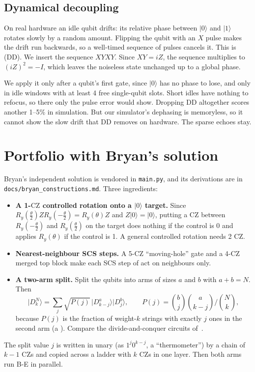 \documentclass[11pt]{scrartcl}
\newcommand{\ket}[1]{\lvert #1\rangle}
\newcommand{\D}[2]{D^{#1}_{#2}}
\newcommand{\CZ}{\ensuremath{\mathrm{CZ}}}
\newcommand{\file}[1]{\texttt{\small #1}}
\begin{document}
\subsection{Dynamical decoupling}

On real hardware an idle qubit drifts: its relative phase between $\ket0$ and $\ket1$ rotates
slowly by a random amount. Flipping the qubit with an $X$ pulse makes the drift run backwards, so a
well-timed sequence of pulses cancels it. This is  (DD). We insert the
sequence $XYXY$. Since $XY=iZ$, the sequence multiplies to $(iZ)^2=-I$, which leaves the noiseless
state unchanged up to a global phase.

We apply it only after a qubit's first gate, since $\ket0$ has no phase to lose, and only in idle
windows with at least 4 free single-qubit slots. Short idles have nothing to refocus, so there only
the pulse error would show. Dropping DD altogether scores another 1--5\% in simulation. But our
simulator's dephasing is memoryless, so it cannot show the slow drift that DD removes on hardware.
The sparse echoes stay.

\section{Portfolio with Bryan's solution}\label{sec:bryan}

Bryan's independent solution is vendored in \file{main.py}, and its derivations are in
\file{docs/bryan\_constructions.md}. Three ingredients:
\begin{itemize}
  \item \textbf{A 1-\CZ{} controlled rotation onto a $\ket0$ target.} Since
        $R_y(\tfrac\theta2)ZR_y(-\tfrac\theta2)=R_y(\theta)Z$ and $Z\ket0=\ket0$, putting a \CZ{}
        between $R_y(-\tfrac\theta2)$ and $R_y(\tfrac\theta2)$ on the target does nothing if the
        control is 0 and applies $R_y(\theta)$ if the control is 1. A general controlled rotation
        needs 2 \CZ{}.
  \item \textbf{Nearest-neighbour SCS steps.} A 5-\CZ{} ``moving-hole'' gate and a 4-\CZ{} merged
        top block make each SCS step of  act on neighbours only.
  \item \textbf{A two-arm split.} Split the qubits into arms of sizes $a$ and $b$ with $a+b=N$. Then
        \[
          \ket{\D Nk}=\sum_j\sqrt{P(j)}\,\ket{\D a{k-j}}\ket{\D bj},\qquad
          P(j)=\binom bj\binom a{k-j}\Big/\binom Nk,
        \]
        because $P(j)$ is the fraction of weight-$k$ strings with exactly $j$ ones in the second
        arm (a ). Compare the divide-and-conquer circuits
        of~\cite{be22}.
\end{itemize}
The split value $j$ is written in unary (as $1^j0^{k-j}$, a ``thermometer'') by a chain of $k-1$
\CZ{}s and copied across a ladder with $k$ \CZ{}s in one layer. Then both arms run B-E in parallel.
\end{document}
